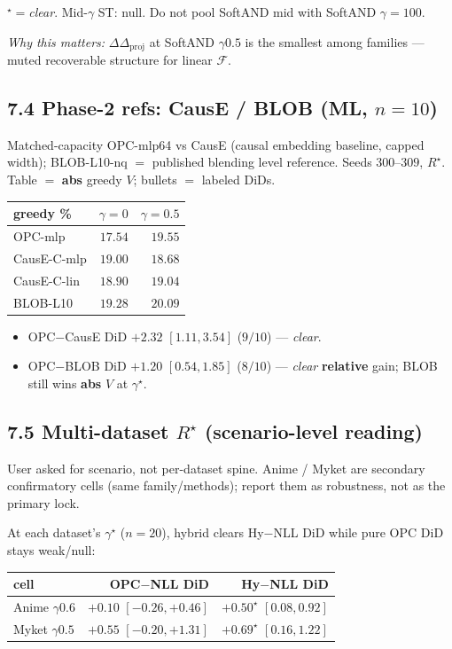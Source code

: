 \documentclass[11pt]{article}
\newcommand{\phonesub}[1]{\Needspace{6\baselineskip}\subsection*{#1}}
\newcommand{\Rstar}{R^{\star}}
\newcommand{\DDproj}{\Delta\Delta_{\mathrm{proj}}}
\newcommand{\why}[1]{\par{\footnotesize\color{blue!35!black}\textit{Why this matters:} #1\par}}
\begin{document}
$^{\star}=$\emph{clear}. Mid-$\gamma$ ST:
null. Do not pool SoftAND mid with
SoftAND $\gamma{=}100$.

\why{$\DDproj$ at SoftAND $\gamma0.5$ is the
smallest among families --- muted recoverable
structure for linear $\mathcal{F}$.}

\phonesub{7.4 Phase-2 refs: CausE / BLOB
(ML, $n{=}10$)}

Matched-capacity OPC-mlp64 vs CausE
(causal embedding baseline, capped width);
BLOB-L10-nq $=$ published blending level
reference. Seeds $300$--$309$, $\Rstar$.
Table $=$ \textbf{abs} greedy $V$; bullets $=$
labeled DiDs.

{\scriptsize
\begin{tabular}{@{}l rr@{}}
\toprule
greedy \% & $\gamma{=}0$ & $\gamma{=}0.5$ \\
\midrule
OPC-mlp & $17.54$ & $19.55$ \\
CausE-C-mlp & $19.00$ & $18.68$ \\
CausE-C-lin & $18.90$ & $19.04$ \\
BLOB-L10 & $19.28$ & $\mathbf{20.09}$ \\
\bottomrule
\end{tabular}}

\begin{itemize}
  \item OPC$-$CausE DiD $+2.32$ $[1.11,3.54]$
        ($9/10$) --- \emph{clear}.
  \item OPC$-$BLOB DiD $+1.20$ $[0.54,1.85]$
        ($8/10$) --- \emph{clear}
        \textbf{relative} gain; BLOB still
        wins \textbf{abs} $V$ at $\gamma^{\star}$.
\end{itemize}

\phonesub{7.5 Multi-dataset $\Rstar$
(scenario-level reading)}

User asked for scenario, not per-dataset
spine. Anime / Myket are secondary
confirmatory cells (same family/methods);
report them as robustness, not as the
primary lock.

At each dataset's $\gamma^{\star}$
($n{=}20$), hybrid clears Hy$-$NLL DiD while
pure OPC DiD stays weak/null:

{\scriptsize
\begin{tabular}{@{}l rr@{}}
\toprule
cell & OPC$-$NLL DiD & Hy$-$NLL DiD \\
\midrule
Anime $\gamma0.6$ &
$+0.10$ $[-0.26,+0.46]$ &
$+0.50^{\star}$ $[0.08,0.92]$ \\
Myket $\gamma0.5$ &
$+0.55$ $[-0.20,+1.31]$ &
$+0.69^{\star}$ $[0.16,1.22]$ \\
\bottomrule
\end{tabular}}
\end{document}

